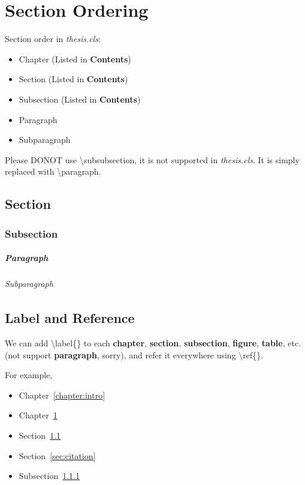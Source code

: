 \chapter{Section Ordering}
\label{chapter:secorder}

Section order in \textit{thesis.cls}:
\begin{itemize}
\item Chapter (Listed in \textbf{Contents})
\item Section (Listed in \textbf{Contents})
\item Subsection (Listed in \textbf{Contents})
\item Paragraph
\item Subparagraph
\end{itemize}
Please DONOT use \textbackslash subsubsection, it is not supported in \textit{thesis.cls}.
It is simply replaced with \textbackslash paragraph.

\section{Section}
\label{sec:secorder}
\lipsum[1-2]

\subsection{Subsection}
\label{subsec:secorder}
\lipsum[3-4]

\paragraph{Paragraph}
\lipsum[5]

\subparagraph{Subparagraph}
\lipsum[6]


\section{Label and Reference}
We can add \textbackslash label\{\} to each \textbf{chapter}, \textbf{section}, \textbf{subsection}, \textbf{figure}, \textbf{table}, etc. (not support \textbf{paragraph}, sorry), and refer it everywhere using \textbackslash ref\{\}.

For example, 
\begin{itemize}
\item Chapter~\ref{chapter:intro}
\item Chapter~\ref{chapter:secorder}
\item Section~\ref{sec:secorder}
\item Section~\ref{sec:citation}
\item Subsection~\ref{subsec:secorder}
\end{itemize}


